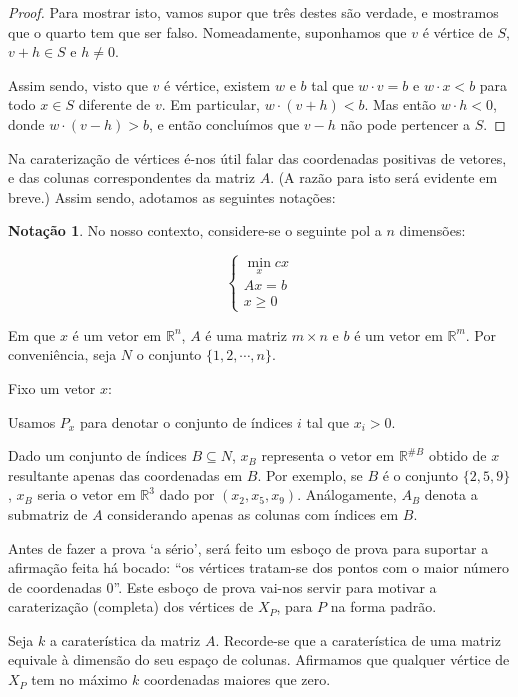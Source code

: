\documentclass{article}
\newcommand{\R}{\mathbb{R}}
\theoremstyle{definition}
\newtheorem*{notacao}{Notação}
\begin{document}
	\begin{proof}
	Para mostrar isto, vamos supor que três destes são verdade, e mostramos que o quarto tem que ser falso. Nomeadamente, suponhamos que $v$ é vértice de $S$, $v+h \in S$ e $h \neq 0$.
	
	Assim sendo, visto que $v$ é vértice, existem $w$ e $b$ tal que $w \cdot v = b$ e $w \cdot x < b$ para todo $x \in S$ diferente de $v$. Em particular, $w \cdot (v + h) < b$. Mas então $w \cdot h < 0$, donde $w \cdot (v-h) > b$, e então concluímos que $v-h$ não pode pertencer a $S$.
	\end{proof}
	
	Na caraterização de vértices é-nos útil falar das coordenadas positivas de vetores, e das colunas correspondentes da matriz $A$. (A razão para isto será evidente em breve.) Assim sendo, adotamos as seguintes notações:
	
	\begin{notacao}
	No nosso contexto, considere-se o seguinte pol a $n$ dimensões:
	
	\[
	\begin{cases}
	\min\limits_x cx\\
	Ax = b\\
	x \geq 0
	\end{cases}
	\]
	
	Em que $x$ é um vetor em $\R^n$, $A$ é uma matriz $m \times n$ e $b$ é um vetor em $\R^m$. Por conveniência, seja $N$ o conjunto $\{1,2,\cdots,n\}$.
	
	Fixo um vetor $x$:
	
	Usamos $P_x$ para denotar o conjunto de índices $i$ tal que $x_i > 0$.
	
	Dado um conjunto de índices $B \subseteq N$, $x_B$ representa o vetor em $\R^{\#B}$ obtido de $x$ resultante apenas das coordenadas em $B$. Por exemplo, se $B$ é o conjunto $\{2, 5, 9\}$, $x_B$ seria o vetor em $\R^3$ dado por $(x_2, x_5, x_9)$. Análogamente, $A_B$ denota a submatriz de $A$ considerando apenas as colunas com índices em $B$.
	\end{notacao}
	
	Antes de fazer a prova `a sério', será feito um esboço de prova para suportar a afirmação feita há bocado: ``os vértices tratam-se dos pontos com o maior número de coordenadas 0''. Este esboço de prova vai-nos servir para motivar a caraterização (completa) dos vértices de $X_P$, para $P$ na forma padrão.
	
	Seja $k$ a caraterística da matriz $A$. Recorde-se que a caraterística de uma matriz equivale à dimensão do seu espaço de colunas. Afirmamos que qualquer vértice de $X_P$ tem no máximo $k$ coordenadas maiores que zero.
	
\end{document}
